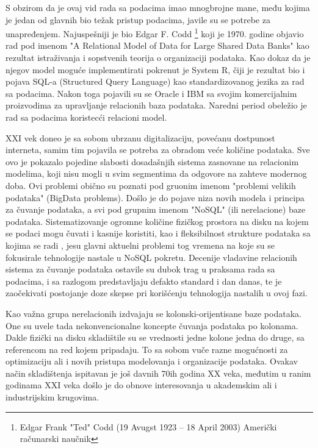 \documentclass[12pt,oneside]{memoir}
\begin{document}
S obzirom da je ovaj vid rada sa podacima imao mnogbrojne mane, među kojima je jedan od glavnih bio težak pristup podacima, javile su se potrebe za unapređenjem. Najuspešniji je bio Edgar F. Codd \footnote{Edgar Frank "Ted" Codd (19 Avugst 1923 – 18 April 2003) Američki računarski naučnik }  koji je 1970. godine objavio rad pod imenom "A Relational Model of Data for Large Shared Data Banks" kao rezultat istraživanja i sopstvenih teorija o organizaciji podataka.  Kao dokaz da je njegov model moguće implementirati pokrenut je System R, čiji je rezultat bio i pojava SQL-a (Structured Query Language) kao standardizovanog jezika za rad sa podacima. Nakon toga pojavili su se Oracle i IBM sa svojim komercijalnim proizvodima za upravljanje relacionih baza podataka. Naredni period obeležio je rad sa podacima koristecći relacioni model.  

XXI vek doneo je sa sobom ubrzanu digitalizaciju, povećanu dostpunost interneta, samim tim pojavila se potreba za obradom veće količine podataka. Sve ovo je pokazalo pojedine slabosti dosadašnjih sistema zasnovane na relacionim modelima, koji nisu mogli u svim segmentima da odgovore na zahteve modernog doba. Ovi problemi obično su poznati pod gruonim imenom "problemi velikih podataka" (BigData problems). Došlo je do pojave niza novih modela i principa za čuvanje podataka, a svi pod grupnim imenom "NoSQL" (ili nerelacione) baze podataka.
Sistematizovanje ogromne količine fizičkog prostora na disku na kojem se podaci mogu čuvati i kasnije koristiti, kao i fleksibilnost strukture podataka sa kojima se radi , jesu glavni aktuelni problemi tog vremena na koje su se fokusirale tehnologije nastale u NoSQL pokretu.
Decenije vladavine  relacionih sistema za čuvanje podataka ostavile su dubok trag u praksama rada sa podacima, i sa razlogom predstavljaju defakto standard i dan danas, te je zaočekivati postojanje doze skepse pri korišćenju tehnologija nastalih u ovoj fazi. 

Kao važna grupa nerelacionih izdvajaju se kolonski-orijentisane baze podataka. One su uvele tada nekonvencionalne koncepte čuvanja podataka po kolonama. Dakle fizički na disku skladištile su se vrednosti jedne kolone jedna do druge, sa referencom na red kojem pripadaju. To sa sobom vuče razne mogućnosti za optimizaciju ali i novih pristupa modelovanja i organizacije podataka. Ovakav način skladištenja ispitavan je još davnih 70ih godina XX veka, međutim u ranim godinama XXI veka došlo je do obnove interesovanja u akademskim ali i industrijskim krugovima. 
\end{document}
